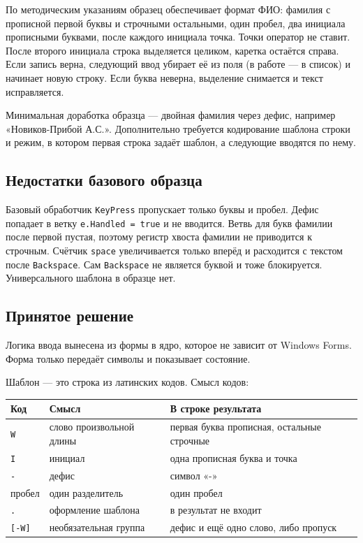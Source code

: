 \documentclass[a4paper,14pt]{extarticle}
\begin{document}
По методическим указаниям образец обеспечивает формат ФИО: фамилия с прописной первой буквы и строчными остальными, один пробел, два инициала прописными буквами, после каждого инициала точка. Точки оператор не ставит. После второго инициала строка выделяется целиком, каретка остаётся справа. Если запись верна, следующий ввод убирает её из поля (в работе --- в список) и начинает новую строку. Если буква неверна, выделение снимается и текст исправляется.

Минимальная доработка образца --- двойная фамилия через дефис, например «Новиков-Прибой А.С.». Дополнительно требуется кодирование шаблона строки и режим, в котором первая строка задаёт шаблон, а следующие вводятся по нему.

\subsection{Недостатки базового образца}

Базовый обработчик \texttt{KeyPress} пропускает только буквы и пробел. Дефис попадает в ветку \texttt{e.Handled = true} и не вводится. Ветвь для букв фамилии после первой пустая, поэтому регистр хвоста фамилии не приводится к строчным. Счётчик \texttt{space} увеличивается только вперёд и расходится с текстом после \texttt{Backspace}. Сам \texttt{Backspace} не является буквой и тоже блокируется. Универсального шаблона в образце нет.

\subsection{Принятое решение}

Логика ввода вынесена из формы в ядро, которое не зависит от Windows Forms. Форма только передаёт символы и показывает состояние.

Шаблон --- это строка из латинских кодов. Смысл кодов:

\begin{center}
\begin{tabular}{lll}
\toprule
Код & Смысл & В строке результата\\
\midrule
\texttt{W} & слово произвольной длины & первая буква прописная, остальные строчные\\
\texttt{I} & инициал & одна прописная буква и точка\\
\texttt{-} & дефис & символ «-»\\
пробел & один разделитель & один пробел\\
\texttt{.} & оформление шаблона & в результат не входит\\
\texttt{[-W]} & необязательная группа & дефис и ещё одно слово, либо пропуск\\
\bottomrule
\end{tabular}
\end{center}
\end{document}
